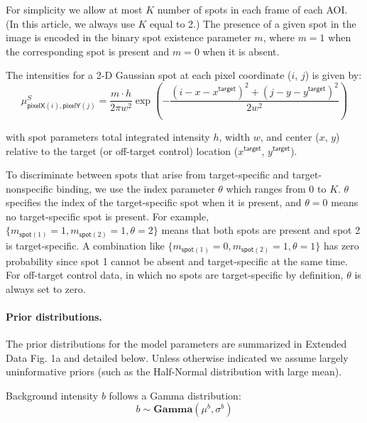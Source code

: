 \noindent
For simplicity we allow at most $K$ number of spots in each frame of each AOI.  (In this article, we always use $K$ equal to 2.)  The presence of a given spot in the image is encoded in the binary spot existence parameter $m$, where $m = 1$ when the corresponding spot is present and $m = 0$ when it is absent.

The intensities for a 2-D Gaussian spot at each pixel coordinate ($i$, $j$) is given by:
%
\begin{equation}
    \mu^S_{\mathsf{pixelX}(i), \mathsf{pixelY}(j)} = \dfrac{m \cdot h}{2 \pi w^2} \exp{\left( -\dfrac{(i-x-x^\mathsf{target})^2 + (j-y-y^\mathsf{target})^2}{2 w^2} \right)}
\end{equation}

\noindent
with spot parameters total integrated intensity $h$, width $w$, and center ($x$, $y$) relative to the target (or off-target control) location ($x^\mathsf{target}$, $y^\mathsf{target}$). 
%

To discriminate between spots that arise from target-specific and target-nonspecific binding, we use the index parameter $\theta$ which ranges from $0$ to $K$. $\theta$ specifies the index of the target-specific spot when it is present, and $\theta = 0$ means no target-specific spot is present. For example, $\{ m_{\mathsf{spot}(1)}=1, m_{\mathsf{spot}(2)}=1, \theta=2 \}$ means that both spots are present and spot 2 is target-specific. A combination like $\{ m_{\mathsf{spot}(1)}=0, m_{\mathsf{spot}(2)}=1, \theta=1 \}$ has zero probability since spot 1 cannot be absent and target-specific at the same time. For off-target control data, in which no spots are target-specific by definition, $\theta$ is always set to zero.
%

\paragraph{Prior distributions.} The prior distributions for the model parameters are summarized in Extended Data Fig. 1a and detailed below. Unless otherwise indicated we assume largely uninformative priors (such as the Half-Normal distribution with large mean). 

Background intensity $b$ follows a Gamma distribution:
%
\begin{equation}
    b \sim \mathbf{Gamma}(\mu^b, \sigma^b)
\end{equation}


